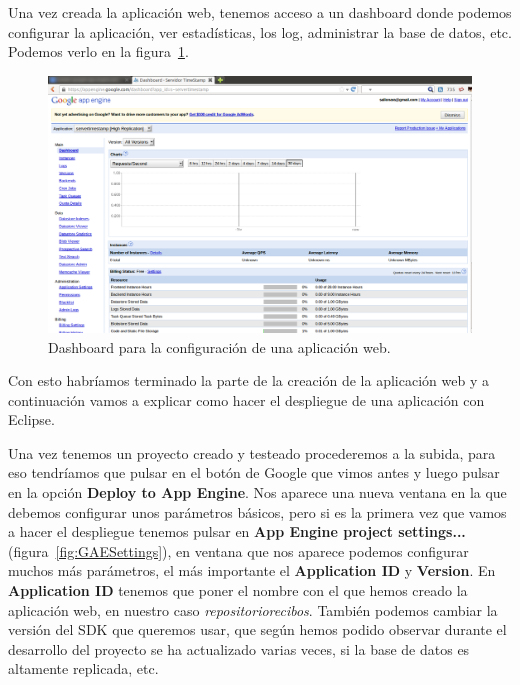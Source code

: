 Una vez creada la aplicación web, tenemos acceso a un dashboard donde podemos configurar la aplicación, ver estadísticas, los log, administrar la base de datos, etc. Podemos verlo en la figura~\ref{fig:dashboardGAE}.

\begin{figure}
  \centering
    \includegraphics[scale=0.6]{./ConfiguracionEclipse/imagenes/dashboardGAE.png}
  \caption{Dashboard para la configuración de una aplicación web.}
  \label{fig:dashboardGAE}
\end{figure}

Con esto habríamos terminado la parte de la creación de la aplicación web y a continuación vamos a explicar como hacer el despliegue de una aplicación con Eclipse.

Una vez tenemos un proyecto creado y testeado procederemos a la subida, para eso tendríamos que pulsar en el botón de Google que vimos antes y luego pulsar en la opción \textbf{Deploy to App Engine}. Nos aparece una nueva ventana en la que debemos configurar unos parámetros básicos, pero si es la primera vez que vamos a hacer el despliegue tenemos pulsar en \textbf{App Engine project settings...} (figura~\ref{fig:GAESettings}), en ventana que nos aparece podemos configurar muchos más parámetros, el más importante el \textbf{Application ID} y \textbf{Version}. En \textbf{Application ID} tenemos que poner el nombre con el que hemos creado la aplicación web, en nuestro caso \textit{repositoriorecibos}. También podemos cambiar la versión del SDK que queremos usar, que según hemos podido observar durante el desarrollo del proyecto se ha actualizado varias veces, si la base de datos es altamente replicada, etc.

